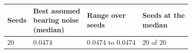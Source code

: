 \begin{tabular}{llll}
\toprule
Seeds & \shortstack[l]{Best assumed\\bearing noise\\(median)} & \shortstack[l]{Range over\\seeds} & \shortstack[l]{Seeds at the\\median} \\
\midrule
20 & 0.0474 & 0.0474 to 0.0474 & 20 of 20 \\
\bottomrule
\end{tabular}

